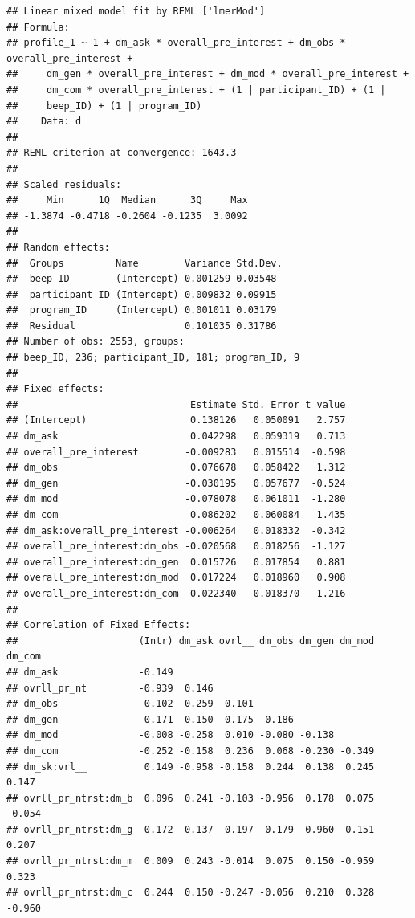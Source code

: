 \documentclass[]{msu-thesis}
\theoremstyle{definition}
\theoremstyle{definition}
\theoremstyle{definition}
\theoremstyle{remark}
\begin{document}
\begin{verbatim}
## Linear mixed model fit by REML ['lmerMod']
## Formula: 
## profile_1 ~ 1 + dm_ask * overall_pre_interest + dm_obs * overall_pre_interest +  
##     dm_gen * overall_pre_interest + dm_mod * overall_pre_interest +  
##     dm_com * overall_pre_interest + (1 | participant_ID) + (1 |  
##     beep_ID) + (1 | program_ID)
##    Data: d
## 
## REML criterion at convergence: 1643.3
## 
## Scaled residuals: 
##     Min      1Q  Median      3Q     Max 
## -1.3874 -0.4718 -0.2604 -0.1235  3.0092 
## 
## Random effects:
##  Groups         Name        Variance Std.Dev.
##  beep_ID        (Intercept) 0.001259 0.03548 
##  participant_ID (Intercept) 0.009832 0.09915 
##  program_ID     (Intercept) 0.001011 0.03179 
##  Residual                   0.101035 0.31786 
## Number of obs: 2553, groups:  
## beep_ID, 236; participant_ID, 181; program_ID, 9
## 
## Fixed effects:
##                              Estimate Std. Error t value
## (Intercept)                  0.138126   0.050091   2.757
## dm_ask                       0.042298   0.059319   0.713
## overall_pre_interest        -0.009283   0.015514  -0.598
## dm_obs                       0.076678   0.058422   1.312
## dm_gen                      -0.030195   0.057677  -0.524
## dm_mod                      -0.078078   0.061011  -1.280
## dm_com                       0.086202   0.060084   1.435
## dm_ask:overall_pre_interest -0.006264   0.018332  -0.342
## overall_pre_interest:dm_obs -0.020568   0.018256  -1.127
## overall_pre_interest:dm_gen  0.015726   0.017854   0.881
## overall_pre_interest:dm_mod  0.017224   0.018960   0.908
## overall_pre_interest:dm_com -0.022340   0.018370  -1.216
## 
## Correlation of Fixed Effects:
##                     (Intr) dm_ask ovrl__ dm_obs dm_gen dm_mod dm_com
## dm_ask              -0.149                                          
## ovrll_pr_nt         -0.939  0.146                                   
## dm_obs              -0.102 -0.259  0.101                            
## dm_gen              -0.171 -0.150  0.175 -0.186                     
## dm_mod              -0.008 -0.258  0.010 -0.080 -0.138              
## dm_com              -0.252 -0.158  0.236  0.068 -0.230 -0.349       
## dm_sk:vrl__          0.149 -0.958 -0.158  0.244  0.138  0.245  0.147
## ovrll_pr_ntrst:dm_b  0.096  0.241 -0.103 -0.956  0.178  0.075 -0.054
## ovrll_pr_ntrst:dm_g  0.172  0.137 -0.197  0.179 -0.960  0.151  0.207
## ovrll_pr_ntrst:dm_m  0.009  0.243 -0.014  0.075  0.150 -0.959  0.323
## ovrll_pr_ntrst:dm_c  0.244  0.150 -0.247 -0.056  0.210  0.328 -0.960

\end{verbatim}
\end{document}
